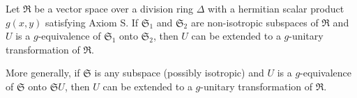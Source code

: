 Let $\mathfrak{R}$ be a vector space over a division ring $\Delta$ with a hermitian scalar product $g(x, y)$ satisfying Axiom S. If $\mathfrak{S}_1$ and $\mathfrak{S}_2$ are non-isotropic subspaces of $\mathfrak{R}$ and $U$ is a $g$-equivalence of $\mathfrak{S}_1$ onto $\mathfrak{S}_2$, then $U$ can be extended to a $g$-unitary transformation of $\mathfrak{R}$.

More generally, if $\mathfrak{S}$ is any subspace (possibly isotropic) and $U$ is a $g$-equivalence of $\mathfrak{S}$ onto $\mathfrak{S}U$, then $U$ can be extended to a $g$-unitary transformation of $\mathfrak{R}$.

